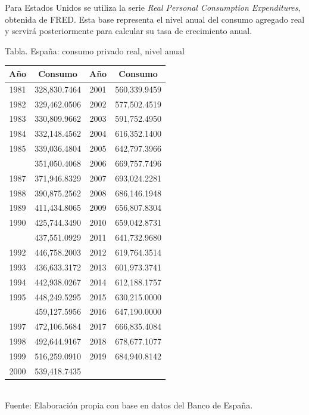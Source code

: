\documentclass{article}\usepackage[]{graphicx}\usepackage[]{xcolor}
\begin{document}
Para Estados Unidos se utiliza la serie \textit{Real Personal Consumption Expenditures}, obtenida de FRED. Esta base representa el nivel anual del consumo agregado real y servirá posteriormente para calcular su tasa de crecimiento anual.



\begin{center}
Tabla. España: consumo privado real, nivel anual
\end{center}
\begin{center}

\begin{tabular}{cccc}
\toprule
Año & Consumo & Año & Consumo\\
\midrule
1981 & 328,830.7464 & 2001 & 560,339.9459\\
1982 & 329,462.0506 & 2002 & 577,502.4519\\
1983 & 330,809.9662 & 2003 & 591,752.4950\\
1984 & 332,148.4562 & 2004 & 616,352.1400\\
1985 & 339,036.4804 & 2005 & 642,797.3966\\
\addlinespace
1986 & 351,050.4068 & 2006 & 669,757.7496\\
1987 & 371,946.8329 & 2007 & 693,024.2281\\
1988 & 390,875.2562 & 2008 & 686,146.1948\\
1989 & 411,434.8065 & 2009 & 656,807.8304\\
1990 & 425,744.3490 & 2010 & 659,042.8731\\
\addlinespace
1991 & 437,551.0929 & 2011 & 641,732.9680\\
1992 & 446,758.2003 & 2012 & 619,764.3514\\
1993 & 436,633.3172 & 2013 & 601,973.3741\\
1994 & 442,938.0267 & 2014 & 612,188.1757\\
1995 & 448,249.5295 & 2015 & 630,215.0000\\
\addlinespace
1996 & 459,127.5956 & 2016 & 647,190.0000\\
1997 & 472,106.5684 & 2017 & 666,835.4084\\
1998 & 492,644.9167 & 2018 & 678,677.1077\\
1999 & 516,259.0910 & 2019 & 684,940.8142\\
2000 & 539,418.7435 &  & \\
\bottomrule
\end{tabular}
\\[0.3em]
{\footnotesize Fuente: Elaboración propia con base en datos del Banco de España.}
\end{center}
\end{document}
